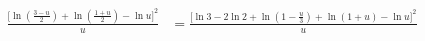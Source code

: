 \begin{align}
\frac{\bigg[\ln\left(\frac{3-u}{2}\right)+\ln\left(\frac{1+u}{2}\right)-\ln u\bigg]^2}u&=\frac{\bigg[\ln3-2\ln2+\ln\left(1-\frac{u}{3}\right)+\ln\left(1+u\right)-\ln u\bigg]^2}u
\end{align}